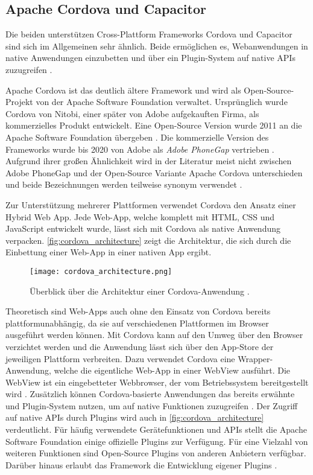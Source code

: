 \subsection{Apache Cordova und Capacitor}
\label{sec:Cordova_Capacitor}
Die beiden unterstützen Cross-Plattform Frameworks Cordova und Capacitor sind sich im Allgemeinen sehr ähnlich.
Beide ermöglichen es, Webanwendungen in native Anwendungen einzubetten und über ein Plugin-System auf native \acp{API} zuzugreifen \cite{Ionic_Cordova_vs_Capacitor}.


Apache Cordova ist das deutlich ältere Framework und wird als Open-Source-Projekt von der Apache Software Foundation verwaltet.
Ursprünglich wurde Cordova von Nitobi, einer später von Adobe aufgekauften Firma, als kommerzielles Produkt entwickelt.
Eine Open-Source Version wurde 2011 an die Apache Software Foundation übergeben \cite{Steyer_Cordova}.
Die kommerzielle Version des Frameworks wurde bis 2020 von Adobe als \textit{Adobe PhoneGap} vertrieben \cite{Adobe_PhoneGap_EOL}.
Aufgrund ihrer großen Ähnlichkeit wird in der Literatur meist nicht zwischen Adobe PhoneGap und der Open-Source Variante Apache Cordova unterschieden und beide Bezeichnungen werden teilweise synonym verwendet \cite{Steyer_Cordova,Manchanda_CrossPlatformFrameworks,Rieger_CrossPlatform_EvaluationFramework}. %

Zur Unterstützung mehrerer Plattformen verwendet Cordova den Ansatz einer Hybrid Web App.
Jede Web-App, welche komplett mit \ac{HTML}, \ac{CSS} und JavaScript entwickelt wurde, lässt sich mit Cordova als native Anwendung verpacken.
\autoref{fig:cordova_architecture} zeigt die Architektur, die sich durch die Einbettung einer Web-App in einer nativen App ergibt.
\begin{figure}[h]
    \centering
    \texttt{[image: cordova\_architecture.png]}
    \caption{Überblick über die Architektur einer Cordova-Anwendung \cite{Cordova_Overview}.}
    \label{fig:cordova_architecture}
\end{figure}



Theoretisch sind Web-Apps auch ohne den Einsatz von Cordova bereits plattformunabhängig, da sie auf verschiedenen Plattformen im Browser ausgeführt werden können.
Mit Cordova kann auf den Umweg über den Browser verzichtet werden und die Anwendung lässt sich über den App-Store der jeweiligen Plattform verbreiten.
Dazu verwendet Cordova eine Wrapper-Anwendung, welche die eigentliche Web-App in einer WebView ausführt.
Die WebView ist ein eingebetteter Webbrowser, der vom Betriebssystem bereitgestellt wird \cite{Steyer_Cordova}.
Zusätzlich können Cordova-basierte Anwendungen das bereits erwähnte und Plugin-System nutzen, um auf native Funktionen zuzugreifen \cite{Heitkoetter_CrossPlatform_Comparison}.
Der Zugriff auf native \acp{API} durch Plugins wird auch in \autoref{fig:cordova_architecture} verdeutlicht.
Für häufig verwendete Gerätefunktionen und \acp{API} stellt die Apache Software Foundation einige offizielle Plugins zur Verfügung.
Für eine Vielzahl von weiteren Funktionen sind Open-Source Plugins von anderen Anbietern verfügbar. 
Darüber hinaus erlaubt das Framework die Entwicklung eigener Plugins \cite{Cordova_Overview}.

